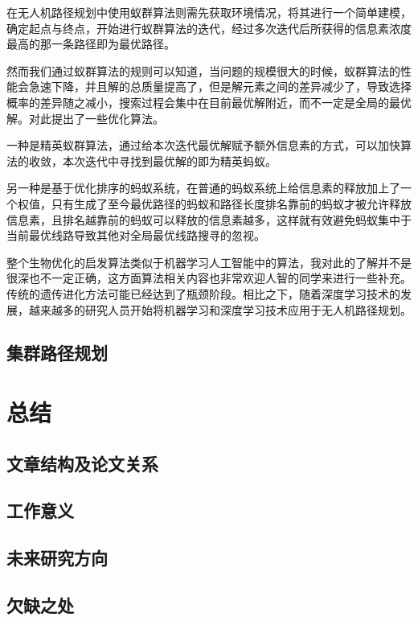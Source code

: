\documentclass[conference]{IEEEtran}
\begin{document}
 在无人机路径规划中使用蚁群算法则需先获取环境情况，将其进行一个简单建模，确定起点与终点，开始进行蚁群算法的迭代，经过多次迭代后所获得的信息素浓度最高的那一条路径即为最优路径。

 然而我们通过蚁群算法的规则可以知道，当问题的规模很大的时候，蚁群算法的性能会急速下降，并且解的总质量提高了，但是解元素之间的差异减少了，导致选择概率的差异随之减小，搜索过程会集中在目前最优解附近，而不一定是全局的最优解。对此提出了一些优化算法。

 一种是精英蚁群算法，通过给本次迭代最优解赋予额外信息素的方式，可以加快算法的收敛，本次迭代中寻找到最优解的即为精英蚂蚁。

 另一种是基于优化排序的蚂蚁系统，在普通的蚂蚁系统上给信息素的释放加上了一个权值，只有生成了至今最优路径的蚂蚁和路径长度排名靠前的蚂蚁才被允许释放信息素，且排名越靠前的蚂蚁可以释放的信息素越多，这样就有效避免蚂蚁集中于当前最优线路导致其他对全局最优线路搜寻的忽视。

 整个生物优化的启发算法类似于机器学习人工智能中的算法，我对此的了解并不是很深也不一定正确，这方面算法相关内容也非常欢迎人智的同学来进行一些补充。传统的遗传进化方法可能已经达到了瓶颈阶段。相比之下，随着深度学习技术的发展，越来越多的研究人员开始将机器学习和深度学习技术应用于无人机路径规划。\cite{生物启发3}
 
\subsection{集群路径规划}%




\section{总结}%



\subsection{文章结构及论文关系}%



\subsection{工作意义}%



\subsection{未来研究方向}%



\subsection{欠缺之处}%




\end{document}
